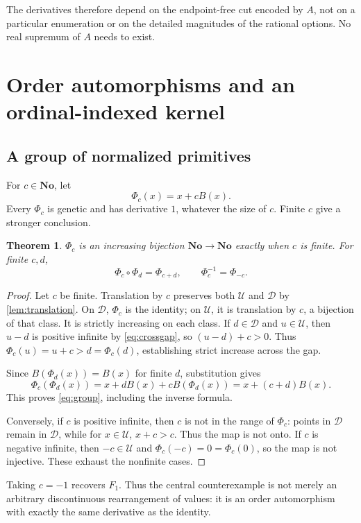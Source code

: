 \documentclass[11pt,letterpaper]{article}
\numberwithin{equation}{section}
\newtheorem{theorem}{Theorem}[section]
\theoremstyle{definition}
\theoremstyle{remark}
\newcommand{\No}{\mathbf{No}}
\newcommand{\U}{\mathcal{U}}
\newcommand{\D}{\mathcal{D}}
\begin{document}
The derivatives therefore depend on the endpoint-free cut encoded by
$A$, not on a particular enumeration or on the detailed magnitudes of
the rational options. No real supremum of $A$ needs to exist.

\section{Order automorphisms and an ordinal-indexed kernel}\label{sec:extensions}
\subsection{A group of normalized primitives}
For $c\in\No$, let
\begin{equation}\label{eq:Fc}
 \Phi_c(x)=x+cB(x).
\end{equation}
Every $\Phi_c$ is genetic and has derivative $1$, whatever the size of $c$.
Finite $c$ give a stronger conclusion.

\begin{theorem}\label{thm:auto}
$\Phi_c$ is an increasing bijection $\No\to\No$ exactly when $c$ is finite.
For finite $c,d$,
\begin{equation}\label{eq:group}
 \Phi_c\circ\Phi_d=\Phi_{c+d},\qquad
 \Phi_c^{-1}=\Phi_{-c}.
\end{equation}
\end{theorem}
\begin{proof}
Let $c$ be finite. Translation by $c$ preserves both $\U$ and $\D$ by
\cref{lem:translation}. On $\D$, $\Phi_c$ is the identity; on $\U$, it is
translation by $c$, a bijection of that class. It is strictly increasing
on each class. If $d\in\D$ and $u\in\U$, then $u-d$ is positive infinite
by \eqref{eq:crossgap}, so $(u-d)+c>0$. Thus
$\Phi_c(u)=u+c>d=\Phi_c(d)$, establishing strict increase across the gap.

Since $B(\Phi_d(x))=B(x)$ for finite $d$, substitution gives
\[
 \Phi_c(\Phi_d(x))=x+dB(x)+cB(\Phi_d(x))
 =x+(c+d)B(x).
\]
This proves \eqref{eq:group}, including the inverse formula.

Conversely, if $c$ is positive infinite, then $c$ is not in the range of
$\Phi_c$: points in $\D$ remain in $\D$, while for $x\in\U$,
$x+c>c$. Thus the map is not onto. If $c$ is negative infinite, then
$-c\in\U$ and $\Phi_c(-c)=0=\Phi_c(0)$, so the map is not injective.
These exhaust the nonfinite cases.
\end{proof}

Taking $c=-1$ recovers $F_1$. Thus the central counterexample is not merely
an arbitrary discontinuous rearrangement of values: it is an order
automorphism with exactly the same derivative as the identity.
\end{document}

